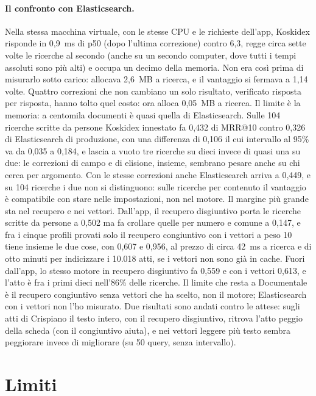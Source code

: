 \paragraph{Il confronto con Elasticsearch.} Nella stessa macchina virtuale, con
le stesse CPU e le richieste dell'app, Koskidex risponde in 0,9~ms di p50 (dopo l'ultima correzione)
contro 6,3, regge circa sette volte le ricerche al secondo (anche su un secondo
computer, dove tutti i tempi assoluti sono più alti) e occupa un decimo della
memoria. Non era così prima di misurarlo sotto carico: allocava 2,6~MB a
ricerca, e il vantaggio si fermava a 1,14 volte. Quattro correzioni che non cambiano
un solo risultato, verificato risposta per risposta, hanno tolto quel costo:
ora alloca 0,05~MB a ricerca.
Il limite è la memoria: a centomila documenti è quasi quella di
Elasticsearch. Sulle 104 ricerche scritte da persone Koskidex innestato fa
0,432 di MRR@10 contro 0,326 di Elasticsearch di produzione, con una differenza
di 0,106 il cui intervallo al 95\% va da 0,035 a 0,184, e lascia a vuoto
tre ricerche su dieci invece di quasi una su due: le correzioni di campo e di
elisione, insieme, sembrano pesare anche su chi cerca per argomento. Con le stesse correzioni anche
Elasticsearch arriva a 0,449, e su 104 ricerche i due non si distinguono: sulle
ricerche per contenuto il vantaggio è compatibile con stare nelle impostazioni,
non nel motore. Il margine più grande sta nel recupero e nei
vettori. Dall'app, il recupero disgiuntivo porta le ricerche scritte da persone
a 0,502 ma fa crollare quelle per numero e comune a 0,147, e fra i cinque profili provati solo il recupero
congiuntivo con i vettori a peso 10 tiene insieme le due cose, con 0,607 e 0,956,
al prezzo di circa 42~ms a ricerca e di otto minuti per indicizzare i 10.018
atti, se i vettori non sono già in cache. Fuori dall'app, lo stesso motore in recupero disgiuntivo fa 0,559 e con i
vettori 0,613, e l'atto è fra i primi dieci nell'86\% delle ricerche. Il limite
che resta a Documentale è il recupero congiuntivo senza vettori che ha scelto,
non il motore; Elasticsearch con i vettori non l'ho misurato.
Due risultati sono andati contro le attese: sugli atti di Crispiano il testo
intero, con il recupero disgiuntivo, ritrova l'atto peggio della scheda (con il
congiuntivo aiuta), e nei vettori leggere più testo sembra peggiorare invece di
migliorare (su 50 query, senza intervallo).

\section{Limiti}\label{sec:limiti}

